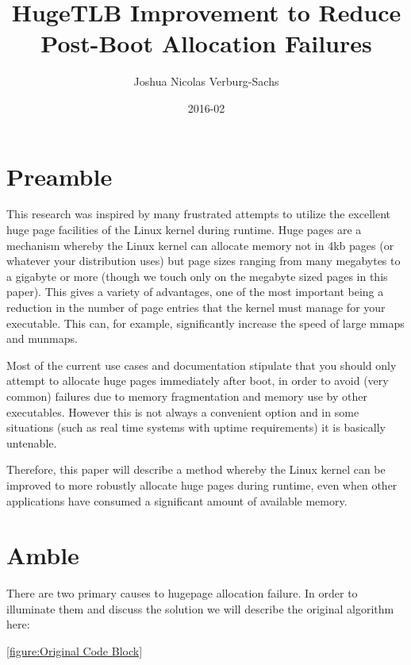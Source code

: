 \documentclass{article}
\title{HugeTLB Improvement to Reduce Post-Boot Allocation Failures}
\date{2016-02}
\author{Joshua Nicolas Verburg-Sachs}
\begin{document}
	\maketitle
	\newpage
	\tableofcontents
	\newpage

	\section{Preamble}
		This research was inspired by many frustrated attempts to utilize the excellent huge page facilities of the Linux kernel during runtime. Huge pages are a mechanism whereby the Linux kernel can allocate memory not in 4kb pages (or whatever your distribution uses) but page sizes ranging from many megabytes to a gigabyte or more (though we touch only on the megabyte sized pages in this paper). This gives a variety of advantages, one of the most important being a reduction in the number of page entries that the kernel must manage for your executable. This can, for example, significantly increase the speed of large mmaps and munmaps.

Most of the current use cases and documentation stipulate that you should only attempt to allocate huge pages immediately after boot, in order to avoid (very common) failures due to memory fragmentation and memory use by other executables. However this is not always a convenient option and in some situations (such as real time systems with uptime requirements) it is basically untenable.

Therefore, this paper will describe a method whereby the Linux kernel can be improved to more robustly allocate huge pages during runtime, even when other applications have consumed a significant amount of available memory.

\section{Amble}
	There are two primary causes to hugepage allocation failure. In order to illuminate them and discuss the solution we will describe the original algorithm here:
\begin{figure}

\end{figure}
\ref{figure:Original Code Block}
\end{document}
